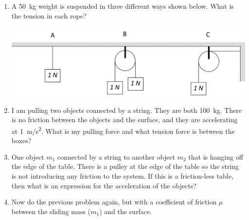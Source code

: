 \begin{enumerate}
\item A \SI{50}{\kilogram} weight is suspended in three different ways shown below. What is the tension in each rope?

\includegraphics[scale=.70]{3separatePulleys.png}\bigskip

\item I am pulling two objects connected by a string. They are both \SI{100}{\kilogram}. There is no friction between the objects and the surface, and they are accelerating at \SI{1}{\meter/\second^2}. What is my pulling force and what tension force is between the boxes? \giantskip


\item One object $m_1$ connected by a string to another object $m_2$ that is hanging off the edge of the table. There is a pulley at the edge of the table so the string is not introducing any friction to the system. If this is a friction-less table, then what is an expression for the acceleration of the objects?\giantskip

\item Now do the previous problem again, but with a coefficient of friction $\mu$ between the sliding mass ($m_1$) and the surface.


%
%
%
%
%



\end{enumerate}